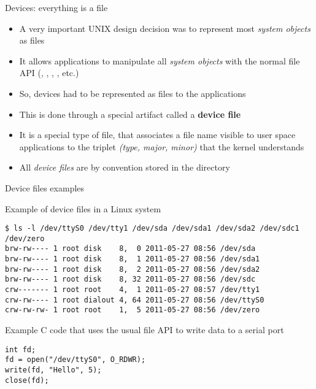 \begin{frame}{Devices: everything is a file}
  \begin{itemize}
  \item A very important UNIX design decision was to represent most
    {\em system objects} as files
  \item It allows applications to manipulate all {\em system objects} with
    the normal file API (, , ,
    , etc.)
  \item So, devices had to be represented as files to the applications
  \item This is done through a special artifact called a {\bf device
      file}
  \item It is a special type of file, that associates a file name
    visible to user space applications to the triplet {\em (type,
      major, minor)} that the kernel understands
  \item All {\em device files} are by convention stored in the
     directory
  \end{itemize}
\end{frame}

\begin{frame}[fragile]{Device files examples}

Example of device files in a Linux system

\small
\begin{verbatim}
$ ls -l /dev/ttyS0 /dev/tty1 /dev/sda /dev/sda1 /dev/sda2 /dev/sdc1 /dev/zero
brw-rw---- 1 root disk    8,  0 2011-05-27 08:56 /dev/sda
brw-rw---- 1 root disk    8,  1 2011-05-27 08:56 /dev/sda1
brw-rw---- 1 root disk    8,  2 2011-05-27 08:56 /dev/sda2
brw-rw---- 1 root disk    8, 32 2011-05-27 08:56 /dev/sdc
crw------- 1 root root    4,  1 2011-05-27 08:57 /dev/tty1
crw-rw---- 1 root dialout 4, 64 2011-05-27 08:56 /dev/ttyS0
crw-rw-rw- 1 root root    1,  5 2011-05-27 08:56 /dev/zero
\end{verbatim}
\normalsize

Example C code that uses the usual file API to write data to a serial port

\small
\begin{verbatim}
int fd;
fd = open("/dev/ttyS0", O_RDWR);
write(fd, "Hello", 5);
close(fd);
\end{verbatim}
\end{frame}

